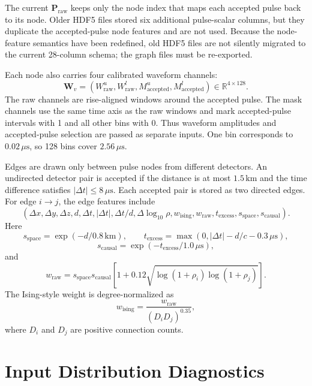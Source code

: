 \documentclass[a4paper,10pt]{article}
\newcommand{\R}{\mathbb{R}}
\begin{document}
The current $\mathbf{P}_{\mathrm{raw}}$ keeps only the node index that maps each accepted pulse back to its node.
Older HDF5 files stored six additional pulse-scalar columns, but they duplicate the accepted-pulse node features and are not used.
Because the node-feature semantics have been redefined, old HDF5 files are not silently migrated to the current 28-column schema; the graph files must be re-exported.

Each node also carries four calibrated waveform channels:
\[
\mathbf{W}_v =
\left(
W^u_{\mathrm{raw}},
W^l_{\mathrm{raw}},
M^u_{\mathrm{accepted}},
M^l_{\mathrm{accepted}}
\right)\in\R^{4\times128}.
\]
The raw channels are rise-aligned windows around the accepted pulse.
The mask channels use the same time axis as the raw windows and mark accepted-pulse intervals with 1 and all other bins with 0.
Thus waveform amplitudes and accepted-pulse selection are passed as separate inputs.
One bin corresponds to $0.02\,\mu\mathrm{s}$, so 128 bins cover $2.56\,\mu\mathrm{s}$.

Edges are drawn only between pulse nodes from different detectors.
An undirected detector pair is accepted if the distance is at most $1.5\,\mathrm{km}$ and the time difference satisfies $|\Delta t|\le8\,\mu\mathrm{s}$.
Each accepted pair is stored as two directed edges.
For edge $i\rightarrow j$, the edge features include
\[
(\Delta x,\Delta y,\Delta z,d,\Delta t,|\Delta t|,\Delta t/d,
\Delta\log_{10}\rho,
w_{\mathrm{ising}},w_{\mathrm{raw}},t_{\mathrm{excess}},s_{\mathrm{space}},s_{\mathrm{causal}}).
\]
Here
\[
  s_{\mathrm{space}}=\exp(-d/0.8\,\mathrm{km}),\qquad
  t_{\mathrm{excess}}=\max(0,|\Delta t|-d/c-0.3\,\mu\mathrm{s}),
\]
\[
  s_{\mathrm{causal}}=\exp(-t_{\mathrm{excess}}/1.0\,\mu\mathrm{s}),
\]
and
\[
  w_{\mathrm{raw}}
  =
  s_{\mathrm{space}}s_{\mathrm{causal}}
  \left[
    1+0.12\sqrt{\log(1+\rho_i)\log(1+\rho_j)}
  \right].
\]
The Ising-style weight is degree-normalized as
\[
  w_{\mathrm{ising}} =
  \frac{w_{\mathrm{raw}}}{(D_iD_j)^{0.35}},
\]
where $D_i$ and $D_j$ are positive connection counts.

\section{Input Distribution Diagnostics}
\end{document}
